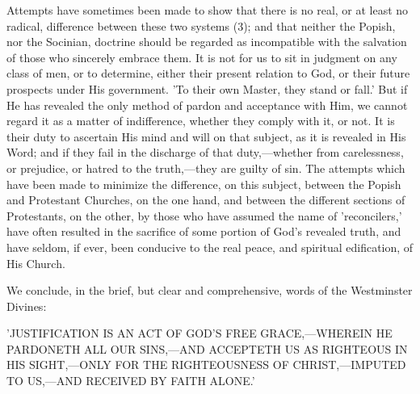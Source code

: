 \documentclass[
]{book}
\begin{document}
Attempts have sometimes been made to show that there is no real, or at least no radical, difference between these two systems (3); and that neither the Popish, nor the Socinian, doctrine should be regarded as incompatible with the salvation of those who sincerely embrace them. It is not for us to sit in judgment on any class of men, or to determine, either their present relation to God, or their future prospects under His government. 'To their own Master, they stand or fall.' But if He has revealed the only method of pardon and acceptance with Him, we cannot regard it as a matter of indifference, whether they comply with it, or not. It is their duty to ascertain His mind and will on that subject, as it is revealed in His Word; and if they fail in the discharge of that duty,---whether from carelessness, or prejudice, or hatred to the truth,---they are guilty of sin. The attempts which have been made to minimize the difference, on this subject, between the Popish and Protestant Churches, on the one hand, and between the different sections of Protestants, on the other, by those who have assumed the name of 'reconcilers,' have often resulted in the sacrifice of some portion of God's revealed truth, and have seldom, if ever, been conducive to the real peace, and spiritual edification, of His Church.

We conclude, in the brief, but clear and comprehensive, words of the Westminster Divines:

'JUSTIFICATION IS AN ACT OF GOD'S FREE GRACE,---WHEREIN HE PARDONETH ALL OUR SINS,---AND ACCEPTETH US AS RIGHTEOUS IN HIS SIGHT,---ONLY FOR THE RIGHTEOUSNESS OF CHRIST,---IMPUTED TO US,---AND RECEIVED BY FAITH ALONE.'
~
\end{document}
